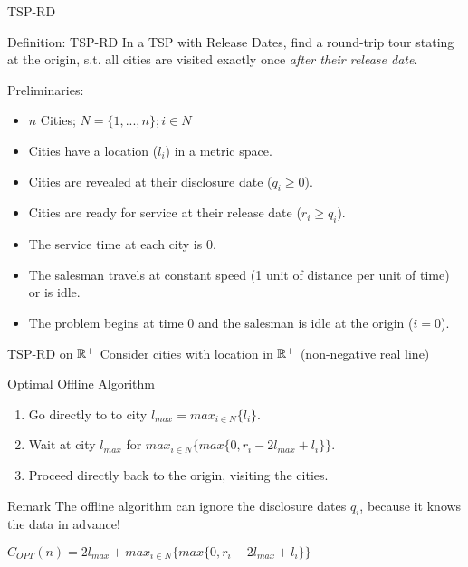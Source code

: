 \begin{frame}{TSP-RD}
  \begin{block}{Definition: TSP-RD}
    In a \alert{TSP with Release Dates}, find a round-trip tour stating at the origin, s.t. all cities are visited exactly once \emph{after their release date}.
  \end{block}
  Preliminaries:
  \begin{itemize}
    \item $n$ Cities; $N=\{1, ... ,n\}; i \in N $
    \item Cities have a location ($l_i$) in a metric space.
    \item Cities are revealed at their disclosure date ($q_i \ge 0$).
    \item Cities are ready for service at their release date ($r_i \ge q_i$).
    \item The service time at each city is 0.
    \item The salesman travels at constant speed (1 unit of distance per unit of time) or is idle.
    \item The problem begins at time 0 and the salesman is idle at the origin ($i=0$).
  \end{itemize}
\end{frame}

\begin{frame}{TSP-RD on $\Bbb{R}^+$}
  Consider cities with location in $\Bbb{R}^+$ (non-negative real line)

  \vspace{5pt}
  \begin{block}{Optimal Offline Algorithm}
    \begin{enumerate}
      \item Go directly to to city $l_{max} = max_{i \in N}\{l_i\}$.
      \item Wait at city $l_{max}$ for $max_{i \in N}\{max\{0,r_i - 2l_{max}+l_i\}\}$.
      \item Proceed directly back to the origin, visiting the cities.
    \end{enumerate}
  \end{block}

  \begin{block}{Remark}
    The offline algorithm can ignore the disclosure dates $q_i$, because it knows the data in advance!
  \end{block}

  $C_{OPT}(n) = 2l_{max} + max_{i \in N}\{max\{0,r_i - 2l_{max}+l_i\}\}$
\end{frame}

